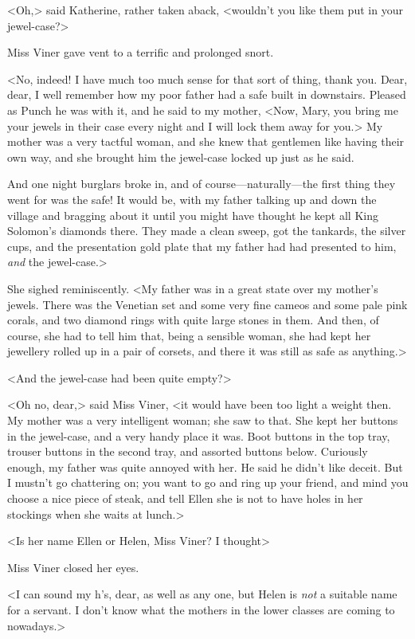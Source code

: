 <Oh,> said Katherine, rather taken aback, <wouldn't you like them put in your jewel-case?>

Miss Viner gave vent to a terrific and prolonged snort.

<No, indeed! I have much too much sense for that sort of thing, thank you. Dear, dear, I well remember how my poor father had a safe built in downstairs. Pleased as Punch he was with it, and he said to my mother, <Now, Mary, you bring me your jewels in their case every night and I will lock them away for you.> My mother was a very tactful woman, and she knew that gentlemen like having their own way, and she brought him the jewel-case locked up just as he said.

And one night burglars broke in, and of course—naturally—the first thing they went for was the safe! It would be, with my father talking up and down the village and bragging about it until you might have thought he kept all King Solomon's diamonds there. They made a clean sweep, got the tankards, the silver cups, and the presentation gold plate that my father had had presented to him, \emph{and} the jewel-case.>

She sighed reminiscently. <My father was in a great state over my mother's jewels. There was the Venetian set and some very fine cameos and some pale pink corals, and two diamond rings with quite large stones in them. And then, of course, she had to tell him that, being a sensible woman, she had kept her jewellery rolled up in a pair of corsets, and there it was still as safe as anything.>

<And the jewel-case had been quite empty?>

<Oh no, dear,> said Miss Viner, <it would have been too light a weight then. My mother was a very intelligent woman; she saw to that. She kept her buttons in the jewel-case, and a very handy place it was. Boot buttons in the top tray, trouser buttons in the second tray, and assorted buttons below. Curiously enough, my father was quite annoyed with her. He said he didn't like deceit. But I mustn't go chattering on; you want to go and ring up your friend, and mind you choose a nice piece of steak, and tell Ellen she is not to have holes in her stockings when she waits at lunch.>

<Is her name Ellen or Helen, Miss Viner? I thought\longdash>

Miss Viner closed her eyes.

<I can sound my h's, dear, as well as any one, but Helen is \emph{not} a suitable name for a servant. I don't know what the mothers in the lower classes are coming to nowadays.>

